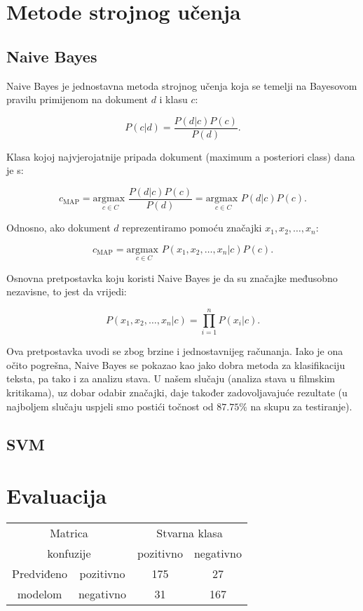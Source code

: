 \documentclass[conference]{IEEEtran}
\begin{document}
\section{Metode strojnog učenja}

\subsection{Naive Bayes}

Naive Bayes je jednostavna metoda strojnog učenja koja se temelji na Bayesovom pravilu primijenom na dokument $d$ i klasu $c$:

\[P(c|d) = \frac{P(d|c)P(c)}{P(d)}.\]

Klasa kojoj najvjerojatnije pripada dokument (maximum a posteriori class) dana je s:

\[c_{\text{MAP}} = \underset{{c \in C}}{\text{argmax }} \frac{P(d|c)P(c)}{P(d)}
= \underset{{c \in C}}{\text{argmax }} P(d|c)P(c).\] 

Odnosno, ako dokument $d$ reprezentiramo pomoću značajki $x_1, x_2, \ldots, x_n$:

\[c_{\text{MAP}} = \underset{{c \in C}}{\text{argmax }} P(x_1, x_2, \ldots, x_n|c)P(c).\]

Osnovna pretpostavka koju koristi Naive Bayes je da su značajke međusobno nezavisne, to jest da vrijedi:

\[P(x_1, x_2, \ldots, x_n|c) = \prod_{i=1}^n P(x_i|c).\]

Ova pretpostavka uvodi se zbog brzine i jednostavnijeg računanja. Iako je ona očito pogrešna, Naive Bayes se pokazao kao jako dobra metoda za klasifikaciju teksta, pa tako i za analizu stava. U našem slučaju (analiza stava u filmskim kritikama), uz dobar odabir značajki, daje također zadovoljavajuće rezultate (u najboljem slučaju uspjeli smo postići točnost od $87.75\%$ na skupu za testiranje).

\subsection{SVM}

\section{Evaluacija}

\begin{tabular}{|c|c|c|c|}
  \hline
  \multicolumn{2}{|c|}{Matrica}  & \multicolumn{2}{|c|}{Stvarna klasa} \\ 
  \cline{3-4}
  \multicolumn{2}{|c|}{konfuzije} & pozitivno & negativno \\ 
  \hline
  Predviđeno & pozitivno & 175 & 27 \\
  \cline{2-4}
  modelom & negativno & 31 & 167 \\
  \hline
\end{tabular}
\end{document}
